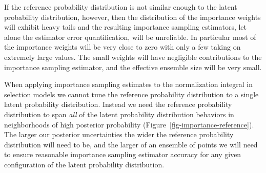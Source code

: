 \documentclass[
  letterpaper,
  DIV=11,
  numbers=noendperiod]{scrartcl}
\begin{document}
If the reference probability distribution is not similar enough to the
latent probability distribution, however, then the distribution of the
importance weights will exhibit heavy tails and the resulting importance
sampling estimators, let alone the estimator error quantification, will
be unreliable. In particular most of the importance weights will be very
close to zero with only a few taking on extremely large values. The
small weights will have negligible contributions to the importance
sampling estimator, and the effective ensemble size will be very small.

When applying importance sampling estimates to the normalization
integral in selection models we cannot tune the reference probability
distribution to a single latent probability distribution. Instead we
need the reference probability distribution to span \emph{all} of the
latent probability distribution behaviors in neighborhoods of high
posterior probability (Figure~\ref{fig-importance-reference}). The
larger our posterior uncertainties the wider the reference probability
distribution will need to be, and the larger of an ensemble of points we
will need to ensure reasonable importance sampling estimator accuracy
for any given configuration of the latent probability distribution.
\end{document}
